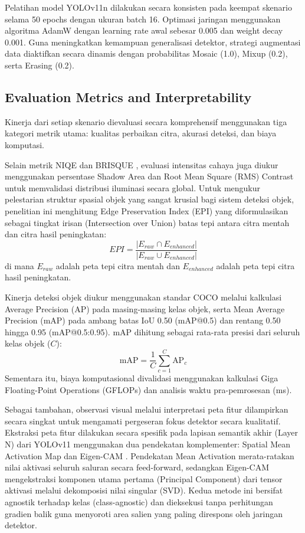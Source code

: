 \documentclass[conference]{IEEEtran}
\begin{document}
Pelatihan model YOLOv11n dilakukan secara konsisten pada keempat skenario selama 50 epochs dengan ukuran batch 16. Optimasi jaringan menggunakan algoritma AdamW dengan learning rate awal sebesar 0.005 dan weight decay 0.001. Guna meningkatkan kemampuan generalisasi detektor, strategi augmentasi data diaktifkan secara dinamis dengan probabilitas Mosaic (1.0), Mixup (0.2), serta Erasing (0.2).

\subsection{Evaluation Metrics and Interpretability}
Kinerja dari setiap skenario dievaluasi secara komprehensif menggunakan tiga kategori metrik utama: kualitas perbaikan citra, akurasi deteksi, dan biaya komputasi. 

Selain metrik NIQE \cite{mittal2013niqe} dan BRISQUE \cite{mittal2012brisque}, evaluasi intensitas cahaya juga diukur menggunakan persentase Shadow Area dan Root Mean Square (RMS) Contrast untuk memvalidasi distribusi iluminasi secara global. Untuk mengukur pelestarian struktur spasial objek yang sangat krusial bagi sistem deteksi objek, penelitian ini menghitung Edge Preservation Index (EPI) yang diformulasikan sebagai tingkat irisan (Intersection over Union) batas tepi antara citra mentah dan citra hasil peningkatan:
\begin{equation}
EPI = \frac{|E_{raw} \cap E_{enhanced}|}{|E_{raw} \cup E_{enhanced}|}
\end{equation}
di mana $E_{raw}$ adalah peta tepi citra mentah dan $E_{enhanced}$ adalah peta tepi citra hasil peningkatan.

Kinerja deteksi objek diukur menggunakan standar COCO \cite{padilla2021metrics} melalui kalkulasi Average Precision (AP) pada masing-masing kelas objek, serta Mean Average Precision (mAP) pada ambang batas IoU 0.50 (mAP@0.5) dan rentang 0.50 hingga 0.95 (mAP@0.5:0.95). mAP dihitung sebagai rata-rata presisi dari seluruh kelas objek ($C$):
\begin{equation}
\text{mAP} = \frac{1}{C} \sum_{c=1}^{C} \text{AP}_c
\end{equation}
Sementara itu, biaya komputasional divalidasi menggunakan kalkulasi Giga Floating-Point Operations (GFLOPs) \cite{akavaram2025flops} dan analisis waktu pra-pemrosesan (ms).

Sebagai tambahan, observasi visual melalui interpretasi peta fitur dilampirkan secara singkat untuk mengamati pergeseran fokus detektor secara kualitatif. Ekstraksi peta fitur dilakukan secara spesifik pada lapisan semantik akhir (Layer N) dari YOLOv11 menggunakan dua pendekatan komplementer: Spatial Mean Activation Map dan Eigen-CAM \cite{muhammad2020eigencam}. Pendekatan Mean Activation merata-ratakan nilai aktivasi seluruh saluran secara feed-forward, sedangkan Eigen-CAM mengekstraksi komponen utama pertama (Principal Component) dari tensor aktivasi melalui dekomposisi nilai singular (SVD). Kedua metode ini bersifat agnostik terhadap kelas (class-agnostic) dan dieksekusi tanpa perhitungan gradien balik guna menyoroti area salien yang paling direspons oleh jaringan detektor.
\end{document}
